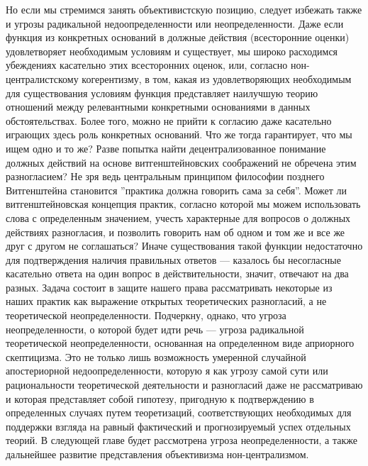 \documentclass[11pt]{book}
\begin{document}
Но если мы стремимся занять объективистскую позицию, следует избежать также и угрозы радикальной недоопределенности или неопределенности. Даже если функция из конкретных оснований в должные действия (всесторонние оценки) удовлетворяет необходимым условиям и существует, мы широко расходимся убеждениях касательно этих всесторонних оценок, или, согласно нон-централистскому когерентизму, в том, какая из удовлетворяющих необходимым для существования условиям функция представляет наилучшую теорию отношений между релевантными конкретными основаниями в данных обстоятельствах. Более того, можно не прийти к согласию даже касательно играющих здесь роль конкретных оснований. Что же тогда гарантирует, что мы ищем одно и то же? Разве попытка найти децентрализованное понимание должных действий на основе витгенштейновских соображений не обречена этим разногласием? Не зря ведь центральным принципом философии позднего Витгенштейна становится ''практика должна говорить сама за себя''. Может ли витгенштейновская концепция практик, согласно которой мы можем использовать слова с определенным значением, учесть характерные для вопросов о должных действиях разногласия, и позволить говорить нам об одном и том же и все же друг с другом не соглашаться? Иначе существования такой функции недостаточно для подтверждения наличия правильных ответов --- казалось бы несогласные касательно ответа на один вопрос в действительности, значит, отвечают на два разных. Задача состоит в защите нашего права рассматривать некоторые из наших практик как выражение открытых теоретических разногласий, а не теоретической неопределенности. Подчеркну, однако, что угроза неопределенности, о которой будет идти речь --- угроза радикальной теоретической неопределенности, основанная на определенном виде априорного скептицизма. Это не только лишь возможность умеренной случайной апостериорной недоопределенности, которую я как угрозу самой сути или рациональности теоретической деятельности и разногласий даже не рассматриваю и которая представляет собой гипотезу, пригодную к подтверждению в определенных случаях путем теоретизаций, соответствующих необходимых для поддержки взгляда на равный фактический и прогнозируемый успех отдельных теорий. В следующей главе будет рассмотрена угроза неопределенности, а также дальнейшее развитие представления объективизма нон-централизмом.
\end{document}
